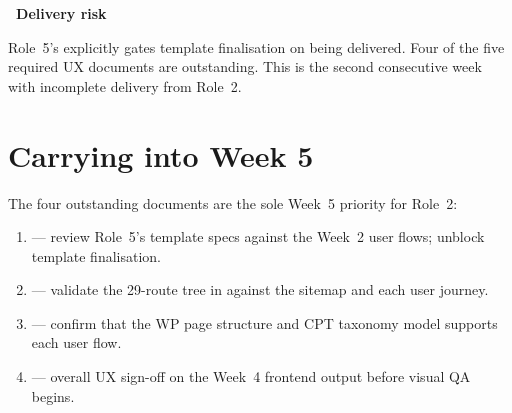 \documentclass[12pt,a4paper]{article}
\begin{document}
\begin{yellowbox}
\textbf{\color{uvtDarkBlue}\faExclamationTriangle\ Delivery risk}

\vspace{6pt}\color{textGray}
Role~5's  explicitly gates template
finalisation on  being delivered.
Four of the five required UX documents are outstanding.
This is the second consecutive week with incomplete delivery from Role~2.
\end{yellowbox}

\section{Carrying into Week 5}

The four outstanding documents are the sole Week~5 priority for Role~2:

\begin{enumerate}
    \item \textbf{} --- review Role~5's template
          specs against the Week~2 user flows; unblock template finalisation.
    \item \textbf{} --- validate the
          29-route tree in  against the sitemap
          and each user journey.
    \item \textbf{} --- confirm that the WP
          page structure and CPT taxonomy model supports each user flow.
    \item \textbf{} --- overall UX sign-off on the Week~4
          frontend output before visual QA begins.
\end{enumerate}
\end{document}
